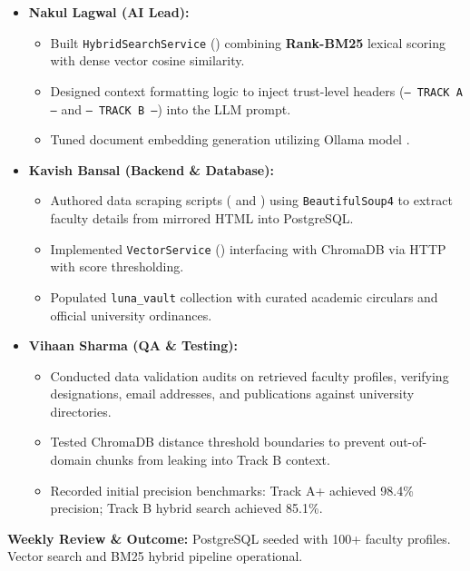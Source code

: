 \documentclass[11pt,a4paper]{article}
\begin{document}
\begin{itemize}
    \setlength{\itemsep}{1pt}
    \item \textbf{Nakul Lagwal (AI Lead):}
    \begin{itemize}
        \setlength{\itemsep}{0pt}
        \item Built \texttt{HybridSearchService} () combining \textbf{Rank-BM25} lexical scoring with dense vector cosine similarity.
        \item Designed context formatting logic to inject trust-level headers (\texttt{--- TRACK A ---} and \texttt{--- TRACK B ---}) into the LLM prompt.
        \item Tuned document embedding generation utilizing Ollama model .
    \end{itemize}

    \item \textbf{Kavish Bansal (Backend \& Database):}
    \begin{itemize}
        \setlength{\itemsep}{0pt}
        \item Authored data scraping scripts ( and ) using \texttt{BeautifulSoup4} to extract faculty details from mirrored HTML into PostgreSQL.
        \item Implemented \texttt{VectorService} () interfacing with ChromaDB via HTTP with score thresholding.
        \item Populated \texttt{luna\_vault} collection with curated academic circulars and official university ordinances.
    \end{itemize}

    \item \textbf{Vihaan Sharma (QA \& Testing):}
    \begin{itemize}
        \setlength{\itemsep}{0pt}
        \item Conducted data validation audits on retrieved faculty profiles, verifying designations, email addresses, and publications against university directories.
        \item Tested ChromaDB distance threshold boundaries to prevent out-of-domain chunks from leaking into Track B context.
        \item Recorded initial precision benchmarks: Track A+ achieved 98.4\% precision; Track B hybrid search achieved 85.1\%.
    \end{itemize}
\end{itemize}
\noindent \textbf{Weekly Review \& Outcome:} PostgreSQL seeded with 100+ faculty profiles. Vector search and BM25 hybrid pipeline operational.
\end{document}
